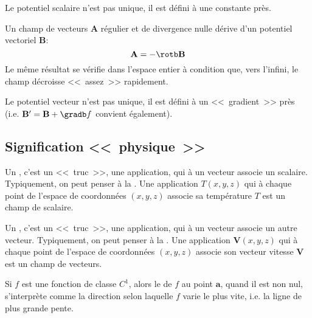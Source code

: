 Le potentiel scalaire n'est pas unique, il est défini à une constante près.

\medskip
Un champ de vecteurs $\mathbf{A} $ régulier et de divergence nulle dérive d'un potentiel vectoriel
$\mathbf{B} $:
\begin{equation}
    \mathbf{A}  = -\rotb \mathbf{B}
\end{equation}
Le même résultat se vérifie dans l'espace entier à condition que, vers l'infini, le champ
décroisse <<~assez~>> rapidement.

Le potentiel vecteur n'est pas unique, il est défini à un <<~gradient~>> près (i.e.
$ \mathbf{B} ' =  \mathbf{B}  + \gradb  f$ convient
également).

\medskip
\subsection{Signification <<~physique~>>}

Un , c'est un <<~truc~>>, une application, qui à un vecteur
associe un scalaire. Typiquement, on peut penser à la .
Une application $T(x,y,z)$ qui à chaque point de l'espace de coordonnées $(x,y,z)$ associe
sa température $T$ est un champ de scalaire.

Un , c'est un <<~truc~>>, une application, qui à un vecteur
associe un autre vecteur. Typiquement, on peut penser à la .
Une application $\mathbf{V}(x,y,z)$ qui à chaque point de l'espace de coordonnées $(x,y,z)$
associe son vecteur vitesse $\mathbf{V}$ est un champ de vecteurs.

\medskip
Si $f$ est une fonction de classe $C^1$, alors le  de $f$ au point $\mathbf{a}$,
quand il est non nul, s'interprète comme la direction selon laquelle $f$ varie le plus vite,
i.e. la ligne de plus grande pente.


